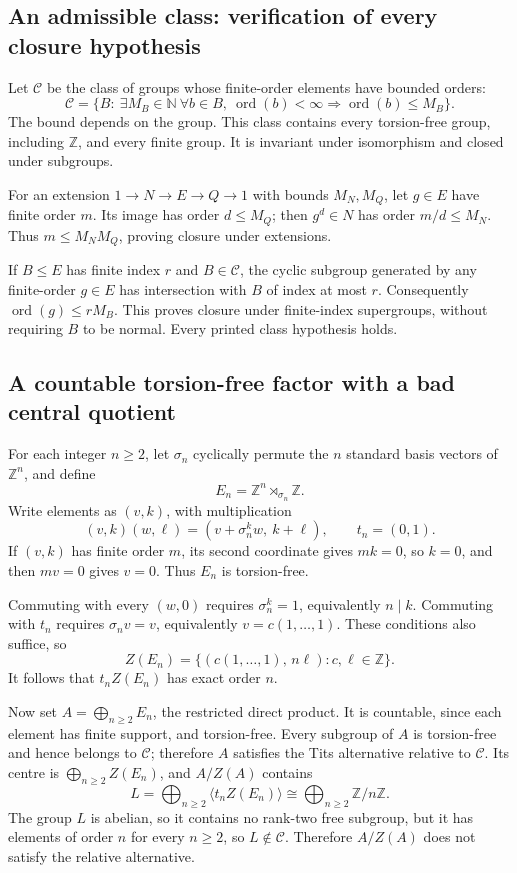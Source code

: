 \documentclass[10pt]{article}
\begin{document}
\subsection*{An admissible class: verification of every closure hypothesis}
Let \(\mathcal C\) be the class of groups whose finite-order elements have bounded orders: \[\mathcal C=\{B:\ \exists M_B\in\mathbb N\ \forall b\in B,\
        \operatorname{ord}(b)<\infty\Rightarrow \operatorname{ord}(b)\leq M_B\}.\] The bound depends on the group. This class contains every torsion-free group, including \(\mathbb Z\), and every finite group. It is invariant under isomorphism and closed under subgroups.\par
For an extension \(1\to N\to E\to Q\to1\) with bounds \(M_N,M_Q\), let \(g\in E\) have finite order \(m\). Its image has order \(d\leq M_Q\); then \(g^d\in N\) has order \(m/d\leq M_N\). Thus \(m\leq M_NM_Q\), proving closure under extensions.\par
If \(B\leq E\) has finite index \(r\) and \(B\in\mathcal C\), the cyclic subgroup generated by any finite-order \(g\in E\) has intersection with \(B\) of index at most \(r\). Consequently \(\operatorname{ord}(g)\leq rM_B\). This proves closure under finite-index supergroups, without requiring \(B\) to be normal. Every printed class hypothesis holds.\par
\subsection*{A countable torsion-free factor with a bad central quotient}
For each integer \(n\geq2\), let \(\sigma_n\) cyclically permute the \(n\) standard basis vectors of \(\mathbb Z^n\), and define \[E_n=\mathbb Z^n\rtimes_{\sigma_n}\mathbb Z.\] Write elements as \((v,k)\), with multiplication \[(v,k)(w,\ell)=(v+\sigma_n^k w,\ k+\ell),\qquad t_n=(0,1).\] If \((v,k)\) has finite order \(m\), its second coordinate gives \(mk=0\), so \(k=0\), and then \(mv=0\) gives \(v=0\). Thus \(E_n\) is torsion-free.\par
Commuting with every \((w,0)\) requires \(\sigma_n^k=1\), equivalently \(n\mid k\). Commuting with \(t_n\) requires \(\sigma_n v=v\), equivalently \(v=c(1,\ldots,1)\). These conditions also suffice, so \[Z(E_n)=\{(c(1,\ldots,1),\,n\ell):c,\ell\in\mathbb Z\}.\] It follows that \(t_nZ(E_n)\) has exact order \(n\).\par
Now set \(A=\bigoplus_{n\geq2}E_n\), the restricted direct product. It is countable, since each element has finite support, and torsion-free. Every subgroup of \(A\) is torsion-free and hence belongs to \(\mathcal C\); therefore \(A\) satisfies the Tits alternative relative to \(\mathcal C\). Its centre is \(\bigoplus_{n\geq2}Z(E_n)\), and \(A/Z(A)\) contains \[L=\bigoplus_{n\geq2}\langle t_n Z(E_n)\rangle
\cong\bigoplus_{n\geq2}\mathbb Z/n\mathbb Z.\] The group \(L\) is abelian, so it contains no rank-two free subgroup, but it has elements of order \(n\) for every \(n\geq2\), so \(L\notin\mathcal C\). Therefore \(A/Z(A)\) does not satisfy the relative alternative.\par
\end{document}
